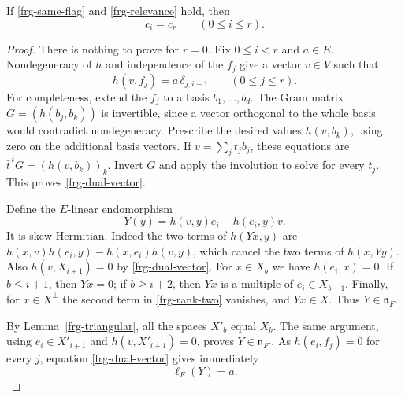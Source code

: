 \begin{proposition}\label{frg-relevant-scalars}
If \eqref{frg-same-flag} and \eqref{frg-relevance} hold, then
\begin{equation}\label{frg-all-scalars}
                              c_i=c_r\qquad(0\le i\le r).
\end{equation}
\end{proposition}
\begin{proof}
There is nothing to prove for $r=0$. Fix $0\le i<r$ and
$a\in E$. Nondegeneracy of $h$ and independence of the $f_j$
give a vector $v\in V$ such that
\begin{equation}\label{frg-dual-vector}
                     h(v,f_j)=a\,\delta_{j,i+1}
                                        \qquad(0\le j\le r).
\end{equation}
For completeness, extend the $f_j$ to a basis $b_1,\ldots,b_d$.
The Gram matrix $G=(h(b_j,b_k))$ is invertible, since a vector
orthogonal to the whole basis would contradict nondegeneracy.
Prescribe the desired values $h(v,b_k)$, using zero on the
additional basis vectors. If $v=\sum_j t_jb_j$, these equations
are $\bar t^{\,t}G=(h(v,b_k))_k$. Invert $G$ and apply the
involution to solve for every $t_j$. This proves
\eqref{frg-dual-vector}.

Define the $E$-linear endomorphism
\begin{equation}\label{frg-rank-two}
                       Y(y)=h(v,y)e_i-h(e_i,y)v.
\end{equation}
It is skew Hermitian. Indeed the two terms of $h(Yx,y)$ are
$h(x,v)h(e_i,y)-h(x,e_i)h(v,y)$, which cancel the two terms
of $h(x,Yy)$.
Also $h(v,X_{i+1})=0$ by \eqref{frg-dual-vector}.
For $x\in X_b$ we have $h(e_i,x)=0$. If $b\le i+1$, then
$Yx=0$; if $b\ge i+2$, then $Yx$ is a multiple of
$e_i\in X_{b-1}$. Finally, for $x\in X^\perp$ the second
term in \eqref{frg-rank-two} vanishes, and $Yx\in X$.
Thus $Y\in\mathfrak n_F$.

By Lemma~\ref{frg-triangular}, all the spaces $X'_b$ equal
$X_b$. The same argument, using $e_i\in X'_{i+1}$ and
$h(v,X'_{i+1})=0$, proves $Y\in\mathfrak n_{F'}$.
As $h(e_i,f_j)=0$ for every $j$, equation
\eqref{frg-dual-vector} gives immediately
\begin{equation}\label{frg-ell-unprimed}
                                  \ell_F(Y)=a.
\end{equation}


\end{proof}
